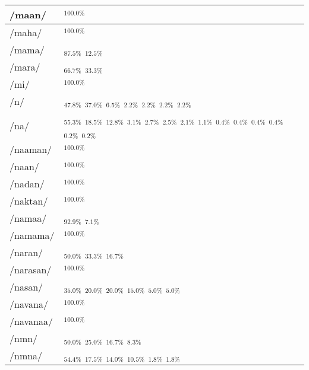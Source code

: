 \documentclass{article}
\begin{document}
\begin{longtable}{|l|p{}|}
/maan/ & \textIndus{}$_{100.0\%}$ \\ \hline
/maha/ & \textIndus{}$_{100.0\%}$ \\ \hline
/mama/ & \textIndus{}$_{87.5\%}$ \quad \textIndus{}$_{12.5\%}$ \\ \hline
/mara/ & \textIndus{}$_{66.7\%}$ \quad \textIndus{}$_{33.3\%}$ \\ \hline
/mi/ & \textIndus{}$_{100.0\%}$ \\ \hline
/n/ & \textIndus{}$_{47.8\%}$ \quad \textIndus{}$_{37.0\%}$ \quad \textIndus{}$_{6.5\%}$ \quad \textIndus{}$_{2.2\%}$ \quad \textIndus{}$_{2.2\%}$ \quad \textIndus{}$_{2.2\%}$ \quad \textIndus{}$_{2.2\%}$ \\ \hline
/na/ & \textIndus{}$_{55.3\%}$ \quad \textIndus{}$_{18.5\%}$ \quad \textIndus{}$_{12.8\%}$ \quad \textIndus{}$_{3.1\%}$ \quad \textIndus{}$_{2.7\%}$ \quad \textIndus{}$_{2.5\%}$ \quad \textIndus{}$_{2.1\%}$ \quad \textIndus{}$_{1.1\%}$ \quad \textIndus{}$_{0.4\%}$ \quad \textIndus{}$_{0.4\%}$ \quad \textIndus{}$_{0.4\%}$ \quad \textIndus{}$_{0.4\%}$ \quad \textIndus{}$_{0.2\%}$ \quad \textIndus{}$_{0.2\%}$ \\ \hline
/naaman/ & \textIndus{}$_{100.0\%}$ \\ \hline
/naan/ & \textIndus{}$_{100.0\%}$ \\ \hline
/nadan/ & \textIndus{}$_{100.0\%}$ \\ \hline
/naktan/ & \textIndus{}$_{100.0\%}$ \\ \hline
/namaa/ & \textIndus{}$_{92.9\%}$ \quad \textIndus{}$_{7.1\%}$ \\ \hline
/namama/ & \textIndus{}$_{100.0\%}$ \\ \hline
/naran/ & \textIndus{}$_{50.0\%}$ \quad \textIndus{}$_{33.3\%}$ \quad \textIndus{}$_{16.7\%}$ \\ \hline
/narasan/ & \textIndus{}$_{100.0\%}$ \\ \hline
/nasan/ & \textIndus{}$_{35.0\%}$ \quad \textIndus{}$_{20.0\%}$ \quad \textIndus{}$_{20.0\%}$ \quad \textIndus{}$_{15.0\%}$ \quad \textIndus{}$_{5.0\%}$ \quad \textIndus{}$_{5.0\%}$ \\ \hline
/navana/ & \textIndus{}$_{100.0\%}$ \\ \hline
/navanaa/ & \textIndus{}$_{100.0\%}$ \\ \hline
/nmn/ & \textIndus{}$_{50.0\%}$ \quad \textIndus{}$_{25.0\%}$ \quad \textIndus{}$_{16.7\%}$ \quad \textIndus{}$_{8.3\%}$ \\ \hline
/nmna/ & \textIndus{}$_{54.4\%}$ \quad \textIndus{}$_{17.5\%}$ \quad \textIndus{}$_{14.0\%}$ \quad \textIndus{}$_{10.5\%}$ \quad \textIndus{}$_{1.8\%}$ \quad \textIndus{}$_{1.8\%}$ \\ \hline

\end{longtable}
\end{document}
